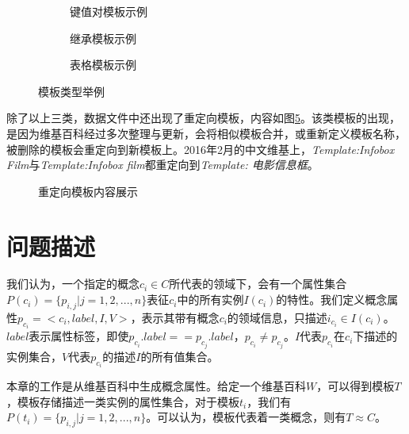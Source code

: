 \begin{figure}[ht]
\centering
    \begin{subfigure}{7.2cm}
        \centering
        \caption{键值对模板示例}
        \label{fig:template-keyvalue}
    \end{subfigure}
    \hspace{0.01cm}
    \begin{subfigure}{7.2cm}
        \centering
        \caption{继承模板示例}
        \label{fig:template-inherit}
    \end{subfigure}
    \vspace{0.01cm}
    \begin{subfigure}{9.6cm}
        \centering
        \caption{表格模板示例}
        \label{fig:template-table}
    \end{subfigure}
\caption{模板类型举例}
\label{fig:template-examples}
\end{figure}

除了以上三类，数据文件中还出现了{\heiti 重定向模板}，内容如图\ref{fig:template-redirect}。该类模板的出现，是因为维基百科经过多次整理与更新，会将相似模板合并，或重新定义模板名称，被删除的模板会重定向到新模板上。2016年2月的中文维基上，\textit{Template:Infobox Film}与\textit{Template:Infobox film}都重定向到\textit{Template: 电影信息框}。

\begin{figure}[H]
  \centering
  \caption{重定向模板内容展示}
  \label{fig:template-redirect}
\end{figure}

\section{问题描述}

我们认为，一个指定的概念$c_i \in C$所代表的领域下，会有一个属性集合$P(c_i)=\{p_{i,j}|j=1,2,...,n\}$表征$c_i$中的所有实例$I(c_i)$的特性。我们定义概念属性$p_{c_i}= <c_i, label, I, V>$，表示其带有概念$c_i$的领域信息，只描述$i_{c_i} \in I(c_i)$。$label$表示属性标签，即使$p_{c_i}.label == p_{c_j}.label$，$p_{c_i} \neq p_{c_j}$。$I$代表$p_{c_i}$在$c_i$下描述的实例集合，$V$代表$p_{c_i}$的描述$I$的所有值集合。

本章的工作是从维基百科中生成概念属性。给定一个维基百科$W$，可以得到模板$T$，模板存储描述一类实例的属性集合，对于模板$t_i$，我们有$P(t_i)=\{p_{i,j}|j=1,2,...,n\}$。可以认为，模板代表着一类概念，则有$T \approx C$。

